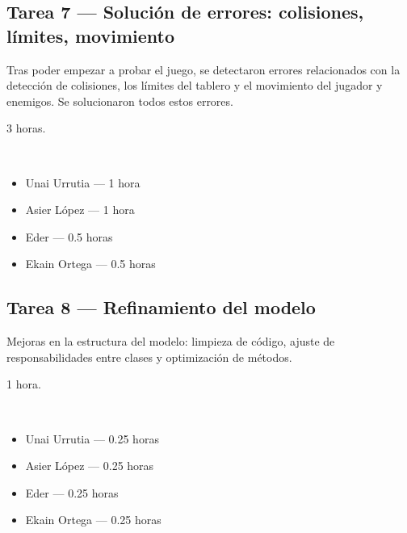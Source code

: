 \documentclass[12pt, a4paper]{article}
\begin{document}
\vspace{0.8em}

\subsection*{Tarea 7 — Solución de errores: colisiones, límites, movimiento}
\begin{description}[leftmargin=2em, style=nextline]
    \item[\textbf{Descripción:}] Tras poder empezar a probar el juego, se detectaron errores relacionados con la detección de colisiones, los límites del tablero y el movimiento del jugador y enemigos. Se solucionaron todos estos errores.
    \item[\textbf{Tiempo:}] 3 horas.
    \item[\textbf{Responsables y dedicación:}]~
        \begin{itemize}[leftmargin=1em, nosep]
            \item Unai Urrutia — 1 hora
            \item Asier López — 1 hora
            \item Eder — 0.5 horas
            \item Ekain Ortega — 0.5 horas
        \end{itemize}
\end{description}

\vspace{0.8em}

\subsection*{Tarea 8 — Refinamiento del modelo}
\begin{description}[leftmargin=2em, style=nextline]
    \item[\textbf{Descripción:}] Mejoras en la estructura del modelo: limpieza de código, ajuste de responsabilidades entre clases y optimización de métodos.
    \item[\textbf{Tiempo:}] 1 hora.
    \item[\textbf{Responsables y dedicación:}]~
        \begin{itemize}[leftmargin=1em, nosep]
            \item Unai Urrutia — 0.25 horas
            \item Asier López — 0.25 horas
            \item Eder — 0.25 horas
            \item Ekain Ortega — 0.25 horas

        \end{itemize}
\end{description}
\end{document}
